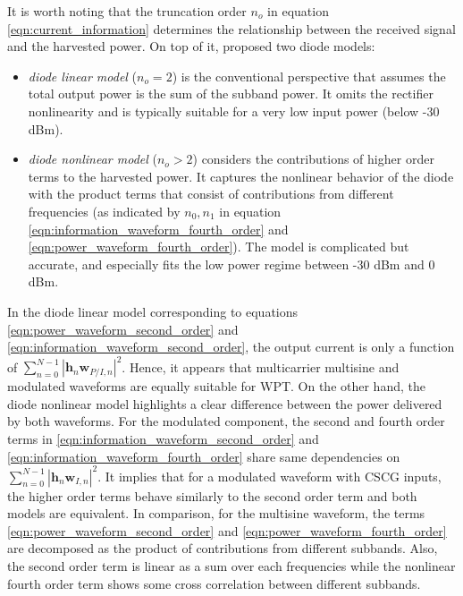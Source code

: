 It is worth noting that the truncation order ${n_o}$ in equation \ref{eqn:current_information} determines the relationship between the received signal and the harvested power. On top of it, \cite{Clerckx2016} proposed two diode models:

\begin{itemize}
  \item \textit{diode linear model} (${n_o} = 2$) is the conventional perspective that assumes the total output power is the sum of the subband power. It omits the rectifier nonlinearity and is typically suitable for a very low input power (below -30 dBm).
  \item \textit{diode nonlinear model} (${n_o} > 2$) considers the contributions of higher order terms to the harvested power. It captures the nonlinear behavior of the diode with the product terms that consist of contributions from different frequencies (as indicated by ${{n_0},{n_1}}$ in equation \ref{eqn:information_waveform_fourth_order} and \ref{eqn:power_waveform_fourth_order}). The model is complicated but accurate, and especially fits the low power regime between -30 dBm and 0 dBm.
\end{itemize}

In the diode linear model corresponding to equations \ref{eqn:power_waveform_second_order} and \ref{eqn:information_waveform_second_order}, the output current is only a function of $\sum\limits_{n = 0}^{N - 1} {{{\left| {{{\mathbf{h}}_n}{{\mathbf{w}}_{P/I,n}}} \right|}^2}} $. Hence, it appears that multicarrier multisine and modulated waveforms are equally suitable for WPT. On the other hand, the diode nonlinear model highlights a clear difference between the power delivered by both waveforms. For the modulated component, the second and fourth order terms in \ref{eqn:information_waveform_second_order} and \ref{eqn:information_waveform_fourth_order} share same dependencies on ${\sum\limits_{n = 0}^{N - 1} {{{\left| {{{\mathbf{h}}_n}{{\mathbf{w}}_{I,n}}} \right|}^2}} }$. It implies that for a modulated waveform with CSCG inputs, the higher order terms behave similarly to the second order term and both models are equivalent. In comparison, for the multisine waveform, the terms \ref{eqn:power_waveform_second_order} and \ref{eqn:power_waveform_fourth_order} are decomposed as the product of contributions from different subbands. Also, the second order term is linear as a sum over each frequencies while the nonlinear fourth order term shows some cross correlation between different subbands.

